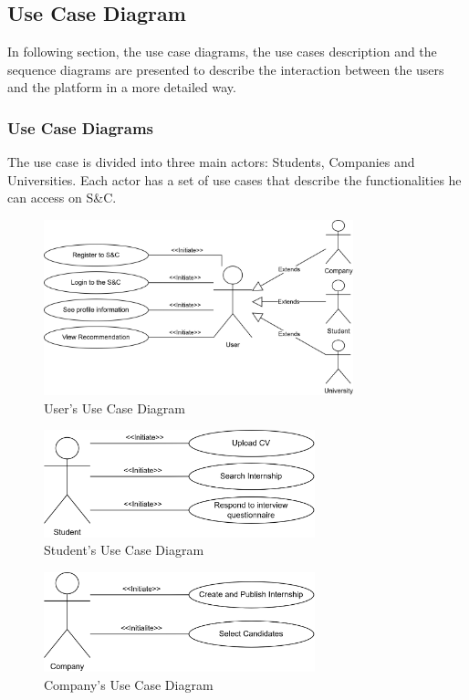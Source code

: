 \subsection{Use Case Diagram}
In following section, the use case diagrams, the use cases description and the sequence diagrams are presented to describe 
the interaction between the users and the platform in a more detailed way.

\subsubsection{Use Case Diagrams}
The use case is divided into three main actors: Students, Companies and Universities. Each actor has a set of use cases that
describe the functionalities he can access on S\&C.
\begin{figure}[H]
    \centering
    \includegraphics[width=0.8\textwidth]{Images/Use_Case_Diagrams/User_diagram.png}
    \caption{User's Use Case Diagram}
\end{figure}
\begin{figure}[H]
    \centering
    \includegraphics[width=0.7\textwidth]{Images/Use_Case_Diagrams/Student_diagram.png}
    \caption{Student's Use Case Diagram}
\end{figure}
\begin{figure}[H]
    \centering
    \includegraphics[width=0.7\textwidth]{Images/Use_Case_Diagrams/Company_diagram.png}
    \caption{Company's Use Case Diagram}
\end{figure}
